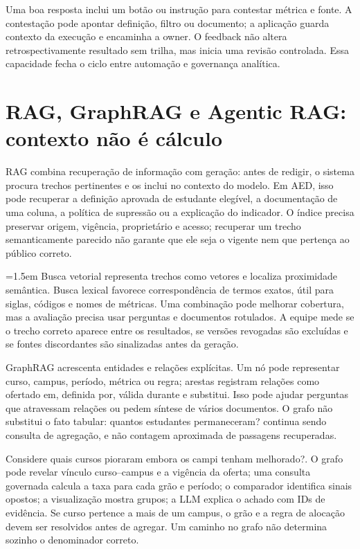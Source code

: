 Uma boa resposta inclui um botão ou instrução para contestar métrica e fonte. A contestação pode apontar definição, filtro ou documento; a aplicação guarda contexto da execução e encaminha a owner. O feedback não altera retrospectivamente resultado sem trilha, mas inicia uma revisão controlada. Essa capacidade fecha o ciclo entre automação e governança analítica.

\section{RAG, GraphRAG e Agentic RAG: contexto não é cálculo}

RAG combina recuperação de informação com geração: antes de redigir, o sistema procura trechos pertinentes e os inclui no contexto do modelo. Em AED, isso pode recuperar a definição aprovada de estudante elegível, a documentação de uma coluna, a política de supressão ou a explicação do indicador. O índice precisa preservar origem, vigência, proprietário e acesso; recuperar um trecho semanticamente parecido não garante que ele seja o vigente nem que pertença ao público correto.

{\emergencystretch=1.5em
Busca vetorial representa trechos como vetores e localiza proximidade semântica. Busca lexical favorece correspondência de termos exatos, útil para siglas, códigos e nomes de métricas. Uma combinação pode melhorar cobertura, mas a avaliação precisa usar perguntas e documentos rotulados. A equipe mede se o trecho correto aparece entre os resultados, se versões revogadas são excluídas e se fontes discordantes são sinalizadas antes da geração.\par}

GraphRAG acrescenta entidades e relações explícitas. Um nó pode representar curso, campus, período, métrica ou regra; arestas registram relações como ofertado em, definida por, válida durante e substitui. Isso pode ajudar perguntas que atravessam relações ou pedem síntese de vários documentos. O grafo não substitui o fato tabular: quantos estudantes permaneceram? continua sendo consulta de agregação, e não contagem aproximada de passagens recuperadas.

Considere quais cursos pioraram embora os campi tenham melhorado?. O grafo pode revelar vínculo curso--campus e a vigência da oferta; uma consulta governada calcula a taxa para cada grão e período; o comparador identifica sinais opostos; a visualização mostra grupos; a LLM explica o achado com IDs de evidência. Se curso pertence a mais de um campus, o grão e a regra de alocação devem ser resolvidos antes de agregar. Um caminho no grafo não determina sozinho o denominador correto.

